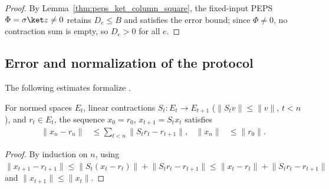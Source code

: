 \begin{proof}\leanok
    By Lemma~\ref{thm:peps_ket_column_square}, the fixed-input PEPS $\Phi=\sigma\ket z\ne0$ retains $D_e\le B$ and satisfies the error bound; since $\Phi\ne0$, no contraction sum is empty, so $D_e>0$ for all $e$.
\end{proof}

\subsection{Error and normalization of the protocol}

The following estimates formalize \cite[Section~8.1]{OpenAI2026PolynomialPEPS}.

\begin{lemma}
    \label{lem:peps_protocol_telescoping}
    \leanok
    For normed spaces $E_t$, linear contractions $S_t\colon E_t\to E_{t+1}$ ($\lVert S_tv\rVert\leq\lVert v\rVert$, $t<n$), and $r_t\in E_t$, the sequence $x_0=r_0$, $x_{t+1}=S_tx_t$ satisfies
    \begin{align}
        \lVert x_n-r_n\rVert & \leq\sum_{t<n}\lVert S_tr_t-r_{t+1}\rVert, &
        \lVert x_n\rVert     & \leq\lVert r_0\rVert.
    \end{align}
\end{lemma}

\begin{proof}\leanok
    By induction on $n$, using $\lVert x_{t+1}-r_{t+1}\rVert\le\lVert S_t(x_t-r_t)\rVert+\lVert S_tr_t-r_{t+1}\rVert\le\lVert x_t-r_t\rVert+\lVert S_tr_t-r_{t+1}\rVert$ and $\lVert x_{t+1}\rVert\le\lVert x_t\rVert$.
\end{proof}

